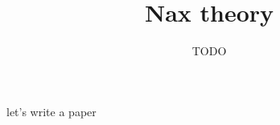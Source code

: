 \documentclass{article}
\title{Nax theory}
\author{TODO}
\begin{document}
\maketitle
let's write a paper
\end{document}
